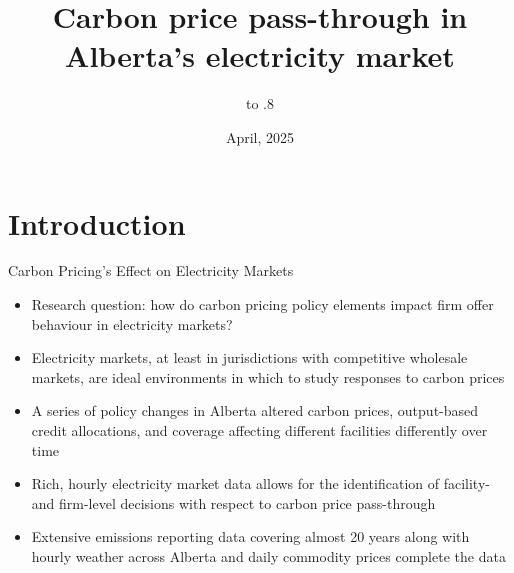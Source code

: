 \documentclass[aspectratio=169]{beamer}
\renewcommand{\(}{\begin{columns}}
\renewcommand{\)}{\end{columns}}
\newcommand{\<}[1]{\begin{column}{#1}}
\renewcommand{\>}{\end{column}}
\begin{document}
\title[Carbon price pass-through]{Carbon price pass-through in Alberta's electricity market}





\author[Andrew Leach]{
\begin{columns}
      \vbox to .8
      \vfill
      \end{columns}
 }




\date[QED Quant Seminar]{April, 2025}

\frame
  \titlepage
  
\section{Introduction}
\begin{frame}{Carbon Pricing's Effect on Electricity Markets}
    \begin{itemize}
    \item Research question: how do carbon pricing policy elements impact firm offer behaviour in electricity markets? 
    \item Electricity markets, at least in jurisdictions with competitive wholesale markets, are ideal environments in which to study responses to carbon prices
    \item A series of policy changes in Alberta altered carbon prices, output-based credit allocations, and coverage affecting different facilities differently over time
    \item Rich, hourly electricity market data allows for the identification of facility- and firm-level decisions with respect to carbon price pass-through
    \item Extensive emissions reporting data covering almost 20 years along with hourly weather across Alberta and daily commodity prices complete the data
        \end{itemize}
\vfill
\end{frame}
\end{document}
